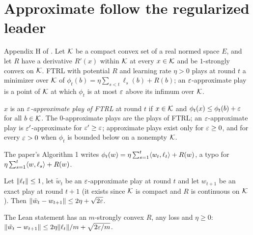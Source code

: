 \chapter{Approximate follow the regularized leader}
\label{chap:ftrl}

Appendix H of \cite{SSKM26}. Let $\mathcal{K}$ be a compact convex set of a real normed space $E$, and
let $R$ have a derivative $R'(x)$ within $\mathcal{K}$ at every $x \in \mathcal{K}$ and be $1$-strongly convex on
$\mathcal{K}$. FTRL with potential $R$ and learning rate $\eta > 0$ plays at round $t$ a minimizer over
$\mathcal{K}$ of $\phi_t(b) = \eta \sum_{s < t} \ell_s(b) + R(b)$; an $\varepsilon$-approximate play is a point of
$\mathcal{K}$ at which $\phi_t$ is at most $\varepsilon$ above its infimum over $\mathcal{K}$.

\begin{definition}
  \label{def:approx_ftrl}
  \leanok
  $x$ is an \emph{$\varepsilon$-approximate play of FTRL} at round $t$ if $x \in \mathcal{K}$ and
  $\phi_t(x) \le \phi_t(b) + \varepsilon$ for all $b \in \mathcal{K}$. The $0$-approximate plays are the plays of
  FTRL; an $\varepsilon$-approximate play is $\varepsilon'$-approximate for $\varepsilon' \ge \varepsilon$; approximate plays
  exist only for $\varepsilon \ge 0$, and for every $\varepsilon > 0$ when $\phi_t$ is bounded below on a
  nonempty $\mathcal{K}$.
\end{definition}

The paper's Algorithm 1 writes $\phi_t(w) = \eta \sum_{s=1}^t \langle w_t, \ell_t \rangle + R(w)$, a typo for
$\eta \sum_{s=1}^t \langle w, \ell_s \rangle + R(w)$.

\begin{lemma}
  \label{lem:ftrl_movement}
  \leanok
  Let $\lVert \ell_t \rVert \le 1$, let $\tilde w_t$ be an $\varepsilon$-approximate play at round $t$ and let
  $w_{t+1}$ be an exact play at round $t + 1$ (it exists since $\mathcal{K}$ is compact and $R$ is
  continuous on $\mathcal{K}$). Then $\lVert \tilde w_t - w_{t+1} \rVert \le 2\eta + \sqrt{2\varepsilon}$.

  The Lean statement has an $m$-strongly convex $R$, any loss and $\eta \ge 0$:
  $\lVert \tilde w_t - w_{t+1} \rVert \le 2\eta\lVert \ell_t \rVert/m + \sqrt{2\varepsilon/m}$.
\end{lemma}


